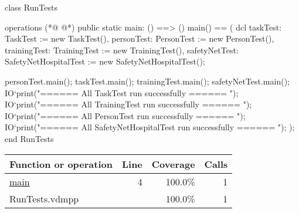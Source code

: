 \begin{vdmpp}[breaklines=true]
class RunTests

operations
(*@
\label{main:4}
@*)
 public static main: () ==> ()
   main() == (
    dcl taskTest: TaskTest := new TaskTest(), personTest: PersonTest := new PersonTest(), 
     trainingTest: TrainingTest := new TrainingTest(), safetyNetTest: SafetyNetHospitalTest := new SafetyNetHospitalTest();
    
    personTest.main();
    taskTest.main(); 
    trainingTest.main();
    safetyNetTest.main();
    IO`print("\n\n ====== All TaskTest run successfully ====== \n\n");
    IO`print("\n\n ====== All TrainingTest run successfully ====== \n\n");
    IO`print("\n\n ====== All PersonTest run successfully ====== \n\n");
   IO`print("\n\n ====== All SafetyNetHospitalTest run successfully ====== \n\n");
   );
end RunTests
\end{vdmpp}
\bigskip
\begin{longtable}{|l|r|r|r|}
\hline
Function or operation & Line & Coverage & Calls \\
\hline
\hline
\hyperref[main:4]{main} & 4&100.0\% & 1 \\
\hline
\hline
RunTests.vdmpp & & 100.0\% & 1 \\
\hline
\end{longtable}

